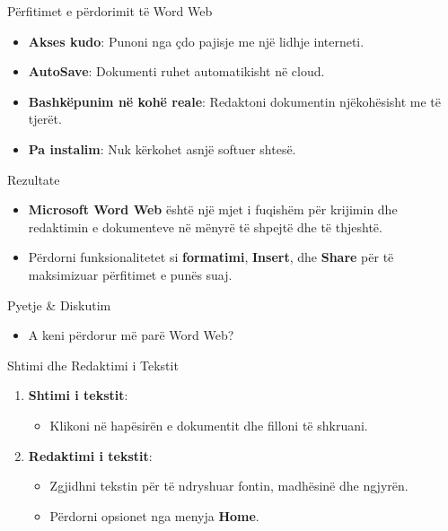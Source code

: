 \documentclass[
  ignorenonframetext,
]{beamer}
\providecommand{\tightlist}{%
  \setlength{\itemsep}{0pt}\setlength{\parskip}{0pt}}
\begin{document}
\begin{frame}{Përfitimet e përdorimit të Word Web}
\label{puxebrfitimet-e-puxebrdorimit-tuxeb-word-web}
\begin{itemize}
\item
  \textbf{Akses kudo}: Punoni nga çdo pajisje me një lidhje interneti.
\item
  \textbf{AutoSave}: Dokumenti ruhet automatikisht në cloud.
\item
  \textbf{Bashkëpunim në kohë reale}: Redaktoni dokumentin njëkohësisht
  me të tjerët.
\item
  \textbf{Pa instalim}: Nuk kërkohet asnjë softuer shtesë.
\end{itemize}
\end{frame}

\begin{frame}{Rezultate}
\label{rezultate}
\begin{itemize}
\item
  \textbf{Microsoft Word Web} është një mjet i fuqishëm për krijimin dhe
  redaktimin e dokumenteve në mënyrë të shpejtë dhe të thjeshtë.
\item
  Përdorni funksionalitetet si \textbf{formatimi}, \textbf{Insert}, dhe
  \textbf{Share} për të maksimizuar përfitimet e punës suaj.
\end{itemize}
\end{frame}

\begin{frame}{Pyetje \& Diskutim}
\label{pyetje-diskutim}
\begin{itemize}
\tightlist
\item
  A keni përdorur më parë Word Web?
\end{itemize}
\end{frame}

\begin{frame}{Shtimi dhe Redaktimi i Tekstit}
\label{shtimi-dhe-redaktimi-i-tekstit}
\begin{enumerate}
\item
  \textbf{Shtimi i tekstit}:

  \begin{itemize}
  \tightlist
  \item
    Klikoni në hapësirën e dokumentit dhe filloni të shkruani.
  \end{itemize}
\item
  \textbf{Redaktimi i tekstit}:

  \begin{itemize}
  \item
    Zgjidhni tekstin për të ndryshuar fontin, madhësinë dhe ngjyrën.
  \item
    Përdorni opsionet nga menyja \textbf{Home}.
  \end{itemize}
\end{enumerate}
\end{frame}
\end{document}
